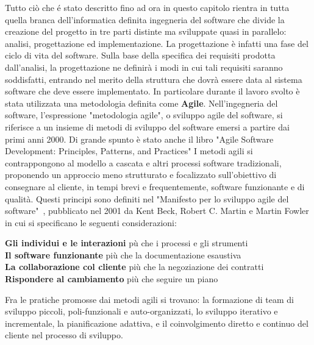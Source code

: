 {Tutto ci\`o che \'e stato descritto fino ad ora in questo capitolo rientra in tutta quella branca dell'informatica definita ingegneria del software che divide la creazione del progetto in tre parti distinte ma sviluppate quasi in parallelo: analisi, progettazione ed implementazione. La progettazione \`e infatti una fase del ciclo di vita del software. Sulla base della specifica dei requisiti prodotta dall'analisi, la progettazione ne definir\`a i modi in cui tali requisiti saranno soddisfatti, entrando nel merito della struttura che dovr\`a essere data al sistema software che deve essere implementato. In particolare durante il lavoro svolto \`e stata utilizzata una metodologia definita come \textbf{Agile}.
Nell'ingegneria del software, l'espressione "metodologia agile", o sviluppo agile del software, si riferisce a un insieme di metodi di sviluppo del software emersi a partire dai primi anni 2000. Di grande spunto \`e stato anche il libro "Agile Software Development: Principles, Patterns, and Practices"\cite{AG:02} I metodi agili si contrappongono al modello a cascata e altri processi software tradizionali, proponendo un approccio meno strutturato e focalizzato sull'obiettivo di consegnare al cliente, in tempi brevi e frequentemente, software funzionante e di qualit\`a.
Questi principi sono definiti nel "Manifesto per lo sviluppo agile del software"~\cite{agile2001},
pubblicato nel 2001 da Kent Beck, Robert C. Martin e Martin Fowler in cui si specificano le seguenti considerazioni:\\
\begin{center}
	\textbf{Gli individui e le interazioni} p\`u che i processi e gli strumenti\\
	\textbf{Il software funzionante} pi\`u che la documentazione esaustiva\\
	\textbf{La collaborazione col cliente} pi\`u che la negoziazione dei contratti\\
	\textbf{Rispondere al cambiamento} pi\`u che seguire un piano\\
\end{center}

Fra le pratiche promosse dai metodi agili si trovano: la formazione di team di sviluppo piccoli, poli-funzionali e auto-organizzati, lo sviluppo iterativo e incrementale, la pianificazione adattiva, e il coinvolgimento diretto e continuo del cliente nel processo di sviluppo.

}
